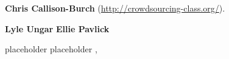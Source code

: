\begin{bio}
{\bfseries Chris Callison-Burch}
(\url{http://crowdsourcing-class.org/}).

{\bfseries Lyle Ungar}
{\bfseries Ellie Pavlick}
\end{bio}

\begin{tutorial}
  {placeholder}
  {placeholder}
  {\daydateyear, \tutorialmorningtime}
  {\TutLocB}


\end{tutorial}
